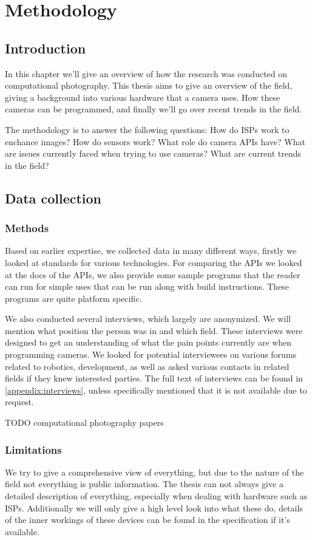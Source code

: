 \chapter{Methodology}
\section{Introduction}
In this chapter we'll give an overview of how the research was conducted on
computational photography. This thesis aims to give an overview of the field,
giving a background into various hardware that a camera uses. How these
cameras can be programmed, and finally we'll go over recent trends in the
field.

The methodology is to answer the following questions: How do ISPs work to
enchance images? How do sensors work? What role do camera APIs have? What
are issues currently faced when trying to use cameras? What are current trends
in the field?

\section{Data collection}
\subsection{Methods}
Based on earlier expertise, we collected data in many different ways, firstly
we looked at standards for various technologies. For comparing the APIs we
looked at the docs of the APIs, we also provide some sample programs that the
reader can run for simple uses that can be run along with build instructions.
These programs are quite platform specific.

We also conducted several interviews, which largely are anonymized. We will
mention what position the person was in and which field. These interviews were
designed to get an understanding of what the pain points currently are when
programming cameras. We looked for potential interviewees on various forums
related to robotics, development, as well as asked various contacts in related
fields if they knew interested parties. The full text of interviews can be
found in \cref{appendix:interviews}, unless specifically mentioned that it is
not available due to request.

TODO computational photography papers

\subsection{Limitations}
We try to give a comprehensive view of everything, but due to the nature of the
field not everything is public information. The thesis can not always give a
detailed description of everything, especially when dealing with hardware such
as ISPs. Additionally we will only give a high level look into what these
do, details of the inner workings of these devices can be found in the
specification if it's available.


